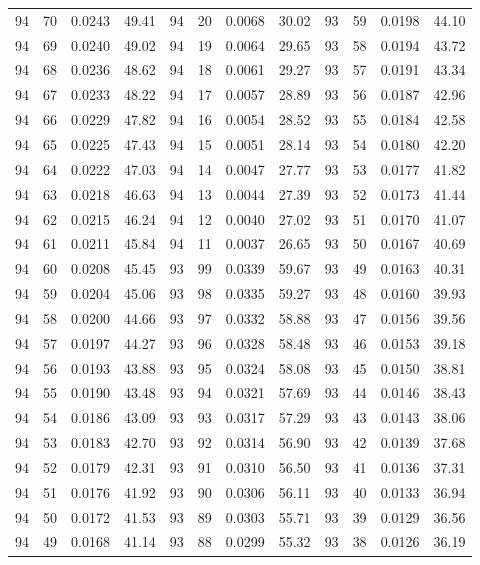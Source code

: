 \begin{tabular}{llll|llll|llll}
94 & 70 & 0.0243 & 49.41 & 94 & 20 & 0.0068 & 30.02 & 93 & 59 & 0.0198 & 44.10\\
94 & 69 & 0.0240 & 49.02 & 94 & 19 & 0.0064 & 29.65 & 93 & 58 & 0.0194 & 43.72\\
94 & 68 & 0.0236 & 48.62 & 94 & 18 & 0.0061 & 29.27 & 93 & 57 & 0.0191 & 43.34\\
94 & 67 & 0.0233 & 48.22 & 94 & 17 & 0.0057 & 28.89 & 93 & 56 & 0.0187 & 42.96\\
94 & 66 & 0.0229 & 47.82 & 94 & 16 & 0.0054 & 28.52 & 93 & 55 & 0.0184 & 42.58\\
94 & 65 & 0.0225 & 47.43 & 94 & 15 & 0.0051 & 28.14 & 93 & 54 & 0.0180 & 42.20\\
94 & 64 & 0.0222 & 47.03 & 94 & 14 & 0.0047 & 27.77 & 93 & 53 & 0.0177 & 41.82\\
94 & 63 & 0.0218 & 46.63 & 94 & 13 & 0.0044 & 27.39 & 93 & 52 & 0.0173 & 41.44\\
94 & 62 & 0.0215 & 46.24 & 94 & 12 & 0.0040 & 27.02 & 93 & 51 & 0.0170 & 41.07\\
94 & 61 & 0.0211 & 45.84 & 94 & 11 & 0.0037 & 26.65 & 93 & 50 & 0.0167 & 40.69\\
94 & 60 & 0.0208 & 45.45 & 93 & 99 & 0.0339 & 59.67 & 93 & 49 & 0.0163 & 40.31\\
94 & 59 & 0.0204 & 45.06 & 93 & 98 & 0.0335 & 59.27 & 93 & 48 & 0.0160 & 39.93\\
94 & 58 & 0.0200 & 44.66 & 93 & 97 & 0.0332 & 58.88 & 93 & 47 & 0.0156 & 39.56\\
94 & 57 & 0.0197 & 44.27 & 93 & 96 & 0.0328 & 58.48 & 93 & 46 & 0.0153 & 39.18\\
94 & 56 & 0.0193 & 43.88 & 93 & 95 & 0.0324 & 58.08 & 93 & 45 & 0.0150 & 38.81\\
94 & 55 & 0.0190 & 43.48 & 93 & 94 & 0.0321 & 57.69 & 93 & 44 & 0.0146 & 38.43\\
94 & 54 & 0.0186 & 43.09 & 93 & 93 & 0.0317 & 57.29 & 93 & 43 & 0.0143 & 38.06\\
94 & 53 & 0.0183 & 42.70 & 93 & 92 & 0.0314 & 56.90 & 93 & 42 & 0.0139 & 37.68\\
94 & 52 & 0.0179 & 42.31 & 93 & 91 & 0.0310 & 56.50 & 93 & 41 & 0.0136 & 37.31\\
94 & 51 & 0.0176 & 41.92 & 93 & 90 & 0.0306 & 56.11 & 93 & 40 & 0.0133 & 36.94\\
94 & 50 & 0.0172 & 41.53 & 93 & 89 & 0.0303 & 55.71 & 93 & 39 & 0.0129 & 36.56\\
94 & 49 & 0.0168 & 41.14 & 93 & 88 & 0.0299 & 55.32 & 93 & 38 & 0.0126 & 36.19\\

\end{tabular}
